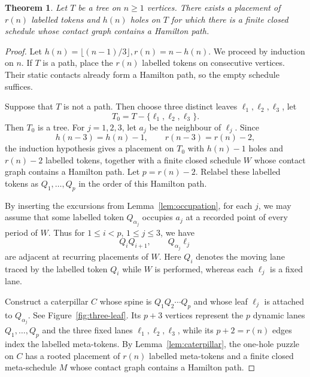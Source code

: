 \documentclass[11pt]{article}
\newtheorem{theorem}{Theorem}[section]
\theoremstyle{remark}
\numberwithin{equation}{section}
\begin{document}
\begin{theorem}\label{thm:tree-vacancy}
Let $T$ be a tree on $n\ge1$ vertices. There exists a placement of $r(n)$ labelled tokens and $h(n)$ holes on $T$ for which there is a finite closed schedule whose contact graph contains a Hamilton path.
\end{theorem}

\begin{proof}
Let $h(n)=\lfloor(n-1)/3\rfloor, r(n)=n-h(n).$ We proceed by induction on $n$. If $T$ is a path, place the $r(n)$ labelled tokens on consecutive vertices. Their static contacts already form a Hamilton path, so the empty schedule suffices.

Suppose that $T$ is not a path. Then choose three distinct leaves $\ell_1,\ell_2,\ell_3$, let
\[
T_0=T-\{\ell_1,\ell_2,\ell_3\}.
\]
Then $T_0$ is a tree. For $j=1,2,3$, let $a_j$ be the neighbour of $\ell_j$. Since
\[
h(n-3)=h(n)-1,
\qquad
r(n-3)=r(n)-2,
\]
the induction hypothesis gives a placement on $T_0$ with $h(n)-1$ holes and $r(n)-2$ labelled tokens, together with a finite closed schedule $W$ whose contact graph contains a Hamilton path. Let $p=r(n)-2$. Relabel these labelled tokens as $Q_1,\ldots,Q_p$ in the order of this Hamilton path.

By inserting the excursions from  Lemma~\ref{lem:occupation}, for each $j$, we may assume that some labelled token $Q_{\alpha_j}$ occupies $a_j$ at a recorded point of every period of $W$. Thus for $1\le i<p$, $1\le j\le3$, we have
\begin{equation}\label{eq:lane-pairs}
Q_iQ_{i+1},
\qquad
Q_{\alpha_j}\ell_j
\end{equation}
are adjacent at recurring placements of $W$. Here $Q_i$ denotes the moving lane traced by the labelled token $Q_i$ while $W$ is performed, whereas each $\ell_j$ is a fixed lane.

Construct a caterpillar $C$ whose spine is $Q_1Q_2\cdots Q_p$ and whose leaf $\ell_j$ is attached to $Q_{\alpha_j}$. See Figure~\ref{fig:three-leaf}. Its $p+3$ vertices represent the $p$ dynamic lanes $Q_1,\ldots,Q_p$ and the three fixed lanes $\ell_1,\ell_2,\ell_3$, while its $p+2=r(n)$ edges index the labelled meta-tokens.
By Lemma~\ref{lem:caterpillar}, the one-hole puzzle on $C$ has a rooted placement of $r(n)$ labelled meta-tokens and a finite closed meta-schedule $M$ whose contact graph contains a Hamilton path.


\end{proof}
\end{document}
